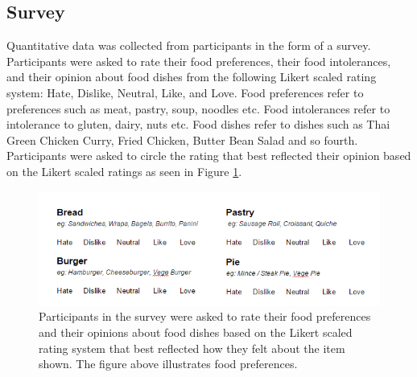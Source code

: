 \subsection{Survey}

Quantitative data was collected from participants in the form of a survey. Participants were asked to rate their food preferences, their food intolerances, and their opinion about food dishes from the following Likert scaled rating system: Hate, Dislike, Neutral, Like, and Love. Food preferences refer to preferences such as meat, pastry, soup, noodles etc. Food intolerances refer to intolerance to gluten, dairy, nuts etc. Food dishes refer to dishes such as Thai Green Chicken Curry, Fried Chicken, Butter Bean Salad and so fourth. Participants were asked to circle the rating that best reflected their opinion based on the Likert scaled ratings as seen in Figure \ref{fig:survey}. 

\begin{figure}
\centering
\includegraphics[scale=1.0]{images/survey_preferences.png}
\caption{Participants in the survey were asked to rate their food preferences and their opinions about food dishes based on the Likert scaled rating system that best reflected how they felt about the item shown. The figure above illustrates food preferences.}
\label{fig:survey}
\end{figure}

